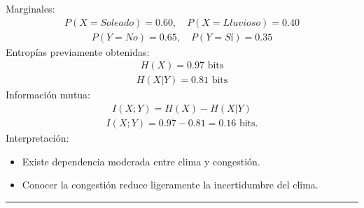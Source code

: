 \documentclass[letterpaper,10pt,english]{jupyterBook}
\begin{document}
\sphinxAtStartPar
Marginales:
\begin{equation*}
\begin{split}
P(X=Soleado)=0.60,\quad P(X=Lluvioso)=0.40
\end{split}
\end{equation*}\begin{equation*}
\begin{split}
P(Y=No)=0.65,\quad P(Y=Sí)=0.35
\end{split}
\end{equation*}
\sphinxAtStartPar
Entropías previamente obtenidas:
\begin{equation*}
\begin{split}
H(X)=0.97 \text{ bits}
\end{split}
\end{equation*}\begin{equation*}
\begin{split}
H(X|Y)=0.81 \text{ bits}
\end{split}
\end{equation*}
\sphinxAtStartPar
Información mutua:
\begin{equation*}
\begin{split}
I(X;Y)=H(X)-H(X|Y)
\end{split}
\end{equation*}\begin{equation*}
\begin{split}
I(X;Y)=0.97-0.81=0.16 \text{ bits}.
\end{split}
\end{equation*}
\sphinxAtStartPar
Interpretación:
\begin{itemize}
\item {} 
\sphinxAtStartPar
Existe dependencia moderada entre clima y congestión.

\item {} 
\sphinxAtStartPar
Conocer la congestión reduce ligeramente la incertidumbre del clima.

\end{itemize}


\bigskip\hrule\bigskip
\end{document}
